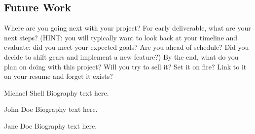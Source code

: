 \documentclass[10pt,conference,onecolumn,compsoc]{IEEEtran}
\begin{document}
\subsection{Future Work}
Where are you going next with your project?
For early deliverable, what are your next steps?  (HINT: you will typically want to look back at your timeline and evaluate: did you meet your expected goals?  Are you ahead of schedule?  Did you decide to shift gears and implement a new feature?)
By the end, what do you plan on doing with this project?  Will you try to sell it?  Set it on fire?  Link to it on your resume and forget it exists?




\begin{IEEEbiography}{Michael Shell}
Biography text here.
\end{IEEEbiography}

\begin{IEEEbiographynophoto}{John Doe}
Biography text here.
\end{IEEEbiographynophoto}

\begin{IEEEbiographynophoto}{Jane Doe}
Biography text here.
\end{IEEEbiographynophoto}
\end{document}
